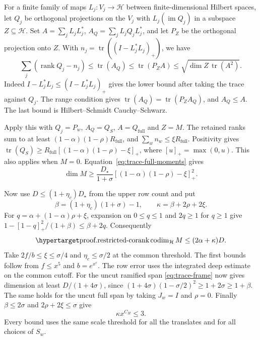 \leavevmode{}%
For a finite family of maps \(L_j:V_j\to\mathcal H\) between finite-dimensional
Hilbert spaces, let \(Q_j\) be orthogonal projections on the \(V_j\) with
\(L_j(\operatorname{im}Q_j)\) in a subspace \(Z\subseteq\mathcal H\).
Set \(A=\sum_j L_jL_j^*\), \(A_Q=\sum_j L_jQ_jL_j^*\), and let \(P_Z\)
be the orthogonal projection onto \(Z\). With
\(n_j=\operatorname{tr}((I-L_j^*L_j)_+)\), we have
\begin{equation}
 \label{eq:positive-trace-compression}
 \sum_j(\operatorname{rank}Q_j-n_j)
 \le\operatorname{tr}(A_Q)
 \le\operatorname{tr}(P_Z A)
 \le\sqrt{\dim Z\,\operatorname{tr}(A^2)} .
\end{equation}
Indeed \(I-L_j^*L_j\le(I-L_j^*L_j)_+\) gives the lower bound after
taking the trace against \(Q_j\). The range condition gives
\(\operatorname{tr}(A_Q)=\operatorname{tr}(P_ZA_Q)\), and \(A_Q\le A\).
The last bound is Hilbert--Schmidt Cauchy--Schwarz.

Apply this with \(Q_j=P_w\), \(A_Q=Q_S\), \(A=Q_{\mathrm{full}}\)
and \(Z=M\). The retained ranks sum to at least
\((1-\alpha)(1-\rho)R_{\mathrm{full}}\), and
\(\sum_w n_w\le\xi R_{\mathrm{full}}\). Positivity gives
\(\operatorname{tr}(Q_S)\ge R_{\mathrm{full}}[(1-\alpha)(1-\rho)-\xi]_+\),
where \([u]_+=\max(0,u)\). This also applies when \(M=0\).
Equation~\eqref{eq:trace-full-moments} gives
\begin{equation}
\label{eq:trace-frame}
 \dim M\ge\frac{D_\star}{1+\sigma}[(1-\alpha)(1-\rho)-\xi]_+^2.
\end{equation}

Now use \(D\le(1+\eta_c)D_\star\) from the upper row count and put
\[
 \beta=(1+\eta_c)(1+\sigma)-1,\qquad
 \kappa=\beta+2\rho+2\xi .
\]
For \(q=\alpha+(1-\alpha)\rho+\xi\), expansion on \(0\le q\le1\)
and \(2q\ge1\) for \(q\ge1\) give
\(1-[1-q]_+^2/(1+\beta)\le\beta+2q\).
Consequently
\begin{equation}
\teamanchor{proof.restricted-corank}
\label{eq:trace-restricted-corank}
 \operatorname{codim}_{\mathcal H}M\le(2\alpha+\kappa)D.
\end{equation}
Take \(2f/b\le\xi\le\sigma/4\) and \(\eta_c\le\sigma/2\) at the common
threshold. The first bounds follow from \(f\le x^5\) and
\(b=e^{x^\varepsilon}\). The row error uses the integrated deep
estimate on the common cutoff. For the uncut
ramified span \eqref{eq:trace-frame} now gives dimension at least
\(D/(1+4\sigma)\), since
\((1+4\sigma)(1-\sigma/2)^2\ge1+2\sigma\ge1+\beta\).
The same holds for the uncut full span by taking \(J_w=I\) and
\(\rho=0\). Finally \(\beta\le2\sigma\) and \(2\rho+2\xi\le\sigma\) give
\begin{equation}
\label{eq:trace-accuracy}
 \kappa x^{C_H}\le3 .
\end{equation}
Every bound uses the same scale threshold for all the translates
and for all choices of \(S_w\).

